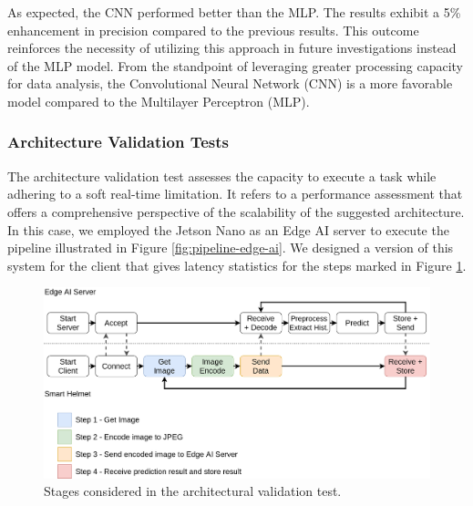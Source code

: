 \begin{table}[h!]
\centering
\caption{Confusion Matrix for the test data - CNN results}
\label{tab:cfmat-test-cnn}
\end{table}

As expected, the CNN performed better than the MLP. The results exhibit a 5\% enhancement in precision compared to the previous results. This outcome reinforces the necessity of utilizing this approach in future investigations instead of the MLP model. From the standpoint of leveraging greater processing capacity for data analysis, the Convolutional Neural Network (CNN) is a more favorable model compared to the Multilayer Perceptron (MLP).

\subsubsection{Architecture Validation Tests}

The architecture validation test assesses the capacity to execute a task while adhering to a soft real-time limitation. It refers to a performance assessment that offers a comprehensive perspective of the scalability of the suggested architecture. In this case, we employed the Jetson Nano as an Edge AI server to execute the pipeline illustrated in Figure \ref{fig:pipeline-edge-ai}. We designed a version of this system for the client that gives latency statistics for the steps marked in Figure \ref{fig:archtest-dataflow}.

\begin{figure}[h!]
    \centering
    \includegraphics[width = .9\linewidth]{Figures/archtest-dataflow.png}
    \caption{Stages considered in the architectural validation test.}
    \label{fig:archtest-dataflow}
\end{figure}

